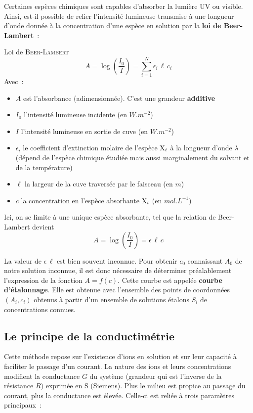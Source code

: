 \documentclass[a4paper, 11pt, final, garamond]{book}
\begin{document}
Certaines espèces chimiques sont capables d'absorber la lumière UV ou visible.
Ainsi, est-il possible de relier l'intensité lumineuse transmise à une longueur
d'onde donnée à la concentration d'une espèce en solution par la \textbf{loi de
Beer-Lambert}~:
\begin{rprop}{Loi de \textsc{Beer-Lambert}}
    \[\boxed{A = \log\left(\frac{I_0}{I}\right) = \sum_{i=1}^{N}\epsilon_i \,
    \ell \, c_i}\]
    Avec~:
    \begin{itemize}
        \item $A$ est l'absorbance (adimensionnée). C'est une grandeur
            \textbf{additive}
        \item $I_0$ l'intensité lumineuse incidente (en $\si{W.m^{-2}}$)
        \item $I$ l'intensité lumineuse en sortie de cuve (en $\si{W.m^{-2}}$)
        \item $\epsilon_i$ le coefficient d'extinction molaire de l'espèce ${\rm
            X}_i$ à la longueur d'onde $\lambda$ (dépend de l'espèce chimique
            étudiée mais aussi marginalement du solvant et de la température)
        \item $\ell$ la largeur de la cuve traversée par le faisceau (en $\si{m}$)
        \item $c$ la concentration en l'espèce absorbante ${\rm X}_i$ (en
            $\si{mol.L^{-1}}$)
    \end{itemize}
\end{rprop}

Ici, on se limite à une unique espèce absorbante, tel que la relation de
Beer-Lambert devient
\[\boxed{A = \log\left(\frac{I_0}{I}\right) = \epsilon \, \ell \, c}\]

La valeur de $\epsilon \, \ell$ est bien souvent inconnue. Pour
obtenir $c_0$ connaissant $A_0$ de notre solution inconnue, il est donc
nécessaire de déterminer préalablement l'expression de la fonction $A=f(c)$.
Cette courbe est appelée \textbf{courbe d'étalonnage}. Elle est obtenue avec
l'ensemble des points de coordonnées $(A_i, c_i)$ obtenus à partir d'un ensemble
de solutions étalons $S_i$ de concentrations connues.

\subsection{Le principe de la conductimétrie}

Cette méthode repose sur l'existence d'ions en solution et sur leur capacité à
faciliter le passage d'un courant. La nature des ions et leurs concentrations
modifient la conductance $G$ du système (grandeur qui est l'inverse de la
résistance $R$) exprimée en \si{S} (Siemens). Plus le milieu est propice au
passage du courant, plus la conductance est élevée. Celle-ci est reliée à trois
paramètres principaux~:
\end{document}
